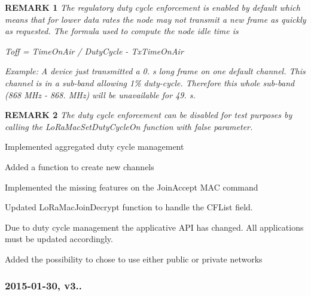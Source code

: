 \begin{DoxyItemize}
\begin{DoxyEnumerate}
\begin{DoxyItemize}
{\bfseries R\+E\+M\+A\+RK 1} {\itshape The regulatory duty cycle enforcement is enabled by default which means that for lower data rates the node may not transmit a new frame as quickly as requested. The formula used to compute the node idle time is}

{\itshape Toff = Time\+On\+Air / Duty\+Cycle -\/ Tx\+Time\+On\+Air}

{\itshape Example\+:} {\itshape A device just transmitted a 0. s long frame on one default channel. This channel is in a sub-\/band allowing 1\% duty-\/cycle. Therefore this whole sub-\/band (868 M\+Hz -\/ 868. M\+Hz) will be unavailable for 49. s.}

{\bfseries R\+E\+M\+A\+RK 2} {\itshape The duty cycle enforcement can be disabled for test purposes by calling the Lo\+Ra\+Mac\+Set\+Duty\+Cycle\+On function with false parameter.}
\item Implemented aggregated duty cycle management
\item Added a function to create new channels
\item Implemented the missing features on the Join\+Accept M\+AC command
\item Updated Lo\+Ra\+Mac\+Join\+Decrypt function to handle the C\+F\+List field.
\end{DoxyItemize}
\item Due to duty cycle management the applicative A\+PI has changed. All applications must be updated accordingly.
\item Added the possibility to chose to use either public or private networks
\end{DoxyEnumerate}
\end{DoxyItemize}

\subsubsection*{2015-\/01-\/30, v3..}


